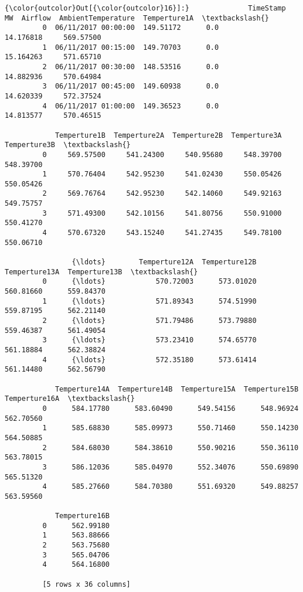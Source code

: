 \documentclass[11pt]{article}
\begin{document}
\begin{Verbatim}[commandchars=\\\{\}]
{\color{outcolor}Out[{\color{outcolor}16}]:}              TimeStamp         MW  Airflow  AmbientTemperature  Temperture1A  \textbackslash{}
         0  06/11/2017 00:00:00  149.51172      0.0           14.176818     569.57500   
         1  06/11/2017 00:15:00  149.70703      0.0           15.164263     571.65710   
         2  06/11/2017 00:30:00  148.53516      0.0           14.882936     570.64984   
         3  06/11/2017 00:45:00  149.60938      0.0           14.620339     572.37524   
         4  06/11/2017 01:00:00  149.36523      0.0           14.813577     570.46515   
         
            Temperture1B  Temperture2A  Temperture2B  Temperture3A  Temperture3B  \textbackslash{}
         0     569.57500     541.24300     540.95680     548.39700     548.39700   
         1     570.76404     542.95230     541.02430     550.05426     550.05426   
         2     569.76764     542.95230     542.14060     549.92163     549.75757   
         3     571.49300     542.10156     541.80756     550.91000     550.41270   
         4     570.67320     543.15240     541.27435     549.78100     550.06710   
         
                {\ldots}        Temperture12A  Temperture12B  Temperture13A  Temperture13B  \textbackslash{}
         0      {\ldots}            570.72003      573.01020      560.81660      559.84370   
         1      {\ldots}            571.89343      574.51990      559.87195      562.21140   
         2      {\ldots}            571.79486      573.79880      559.46387      561.49054   
         3      {\ldots}            573.23410      574.65770      561.18884      562.38824   
         4      {\ldots}            572.35180      573.61414      561.14480      562.56790   
         
            Temperture14A  Temperture14B  Temperture15A  Temperture15B  Temperture16A  \textbackslash{}
         0      584.17780      583.60490      549.54156      548.96924      562.70560   
         1      585.68830      585.09973      550.71460      550.14230      564.50885   
         2      584.68030      584.38610      550.90216      550.36110      563.78015   
         3      586.12036      585.04970      552.34076      550.69890      565.51320   
         4      585.27660      584.70380      551.69320      549.88257      563.59560   
         
            Temperture16B  
         0      562.99180  
         1      563.88666  
         2      563.75680  
         3      565.04706  
         4      564.16800  
         
         [5 rows x 36 columns]
\end{Verbatim}
            
\end{document}
